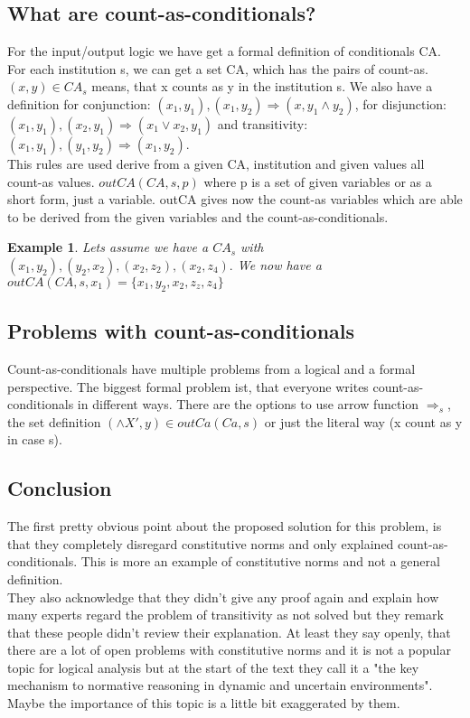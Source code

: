 \documentclass{article}
\newtheorem{exmp}{Example}[section]
\begin{document}
\subsection{What are count-as-conditionals?}
For the input/output logic we have get a formal definition of conditionals CA. For each institution s, we can get a set CA, which has the pairs of count-as. $(x,y) \in CA_s$ means, that x counts as y in the institution s. We also have a definition for conjunction: $(x_1,y_1),(x_1,y_2) \Rightarrow (x, y_1 \land y_2)$, for disjunction: $(x_1,y_1), (x_2,y_1) \Rightarrow (x_1 \lor x_2, y_1)$ and transitivity: $(x_1,y_1),(y_1,y_2) \Rightarrow (x_1,y_2)$. \\
This rules are used derive from a given CA, institution and given values all count-as values.
$outCA(CA,s,p)$ where p is a set of given variables or as a short form, just a variable. outCA gives now the count-as variables which are able to be derived from the given variables and the count-as-conditionals.
\begin{exmp}
Lets assume we have a $CA_s$ with $(x_1,y_2), (y_2, x_2),(x_2,z_2),(x_2,z_4).$ We now have a $outCA(CA,s,x_1) = \{x_1,y_2,x_2,z_z,z_4\}$
\end{exmp}
\subsection{Problems with count-as-conditionals}
Count-as-conditionals have multiple problems from a logical and a formal perspective. The biggest formal problem ist, that everyone writes count-as-conditionals in different ways. There are the options to use arrow function $\Rightarrow_s$, the set definition $(\land X',y) \in outCa(Ca,s)$ or just the literal way (x count as y in case s).\\
\subsection{Conclusion}
The first pretty obvious point about the proposed solution for this problem, is that they completely disregard constitutive norms and only explained count-as-conditionals. This is more an example of constitutive norms and not a general definition.\\
They also acknowledge that they didn't give any proof again and explain how many experts regard the problem of transitivity as not solved but they remark that these people didn't review their explanation. At least they say openly, that there are a lot of open problems with constitutive norms and it is not a popular topic for logical analysis but at the start of the text they call it a "the key mechanism to normative reasoning in dynamic and uncertain environments". Maybe the importance of this topic is a little bit exaggerated by them. 


\end{document}
